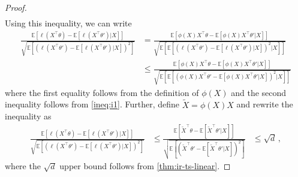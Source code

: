 \documentclass[letter, 12pt]{report}
\newcommand{\E}{\mathbb E}
\newcommand{\1}{\mathbf{1}}
\theoremstyle{plain}
\theoremstyle{definition}
\theoremstyle{remark}
\begin{document}
\begin{proof}
\begin{align}
    \end{align}
    Using this inequality, we can write
    \begin{align*}
        \frac{
            \E\left[
                \ell(X^\top \theta) - \E[\ell(X^\top \theta')|X]
                \right]
        }{
            \sqrt{
                \E\left[
                    \left(\ell(X^\top \theta') - \E[\ell(X^\top \theta')|X]\right)^2
                    \right]
            }
        }
         & =
        \frac{
            \E\left[
                \phi(X)X^\top \theta - \E[\phi(X)X^\top \theta'|X]
                \right]
        }{
            \sqrt{
                \E\left[
                    \E\left[
                        \left(\ell(X^\top \theta') - \E[\ell(X^\top \theta')|X]\right)^2
                        |X
                        \right]
                    \right]
            }
        }
        \\
         & \leq
        \frac{
            \E\left[
                \phi(X)X^\top \theta - \E[\phi(X)X^\top \theta'|X]
                \right]
        }{
            \sqrt{
                \E\left[
                    \E\left[
                        \left(\phi(X)X^\top \theta' -
                        \E[\phi(X)X^\top \theta'|X]\right)^2
                        |X
                        \right]
                    \right]
            }
        }
    \end{align*}
    where the first equality follows from the
    definition of $\phi(X)$ and the second inequality follows from \ref{ineq:i1}.
    Further, define $\tilde{X} = \phi(X)X$ and
    rewrite the inequality as
    \begin{align*}
        \frac{
            \E\left[
                \ell(X^\top \theta) - \E[\ell(X^\top \theta')|X]
                \right]
        }{
            \sqrt{
                \E\left[
                    \left(\ell(X^\top \theta') - \E[\ell(X^\top \theta')|X]\right)^2
                    \right]
            }
        }
         & \leq
        \frac{
            \E\left[
                \tilde{X}^\top \theta - \E[\tilde{X}^\top \theta'|X]
                \right]
        }{
            \sqrt{
                \E\left[
                    \left(\tilde{X}^\top \theta' -
                    \E[\tilde{X}^\top \theta'|X]\right)^2
                    \right]
            }
        }
         & \leq
        \sqrt{d}\,,
    \end{align*}
    where the $\sqrt{d}$ upper bound follows from \cref{thm:ir-ts-linear}.
\end{proof}
\end{document}
